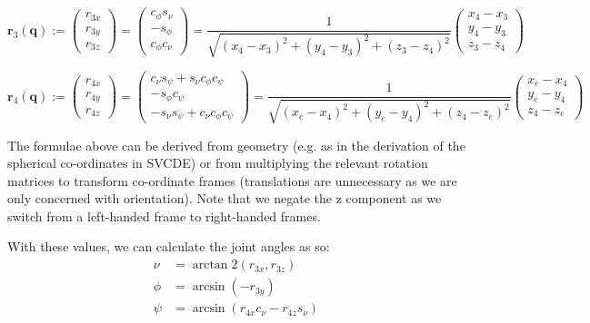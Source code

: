 \documentclass[11pt, a4paper]{article}
\begin{document}
    $$
    \textbf{r}_3(\textbf{q}) :=
    \begin{pmatrix}
        r_{3x}\\
        r_{3y}\\
        r_{3z}
    \end{pmatrix} =
    \begin{pmatrix}
        c_{\phi}s_{\nu}\\
       -s_{\phi}\\
        c_{\phi}c_{\nu}
    \end{pmatrix} = \frac{1}{\sqrt{(x_4 - x_3)^2 + (y_4 - y_3)^2 + (z_3 - z_4)^2}}
    \begin{pmatrix}
        x_4 - x_3\\
        y_4 - y_3\\
        z_3 - z_4
    \end{pmatrix}
    $$

    $$
    \textbf{r}_4(\textbf{q}) :=
    \begin{pmatrix}
        r_{4x}\\
        r_{4y}\\
        r_{4z}
    \end{pmatrix} =
    \begin{pmatrix}
        c_{\nu}s_{\psi} + s_{\nu}c_{\phi}c_{\psi}\\
       -s_{\phi}c_{\psi}\\
       -s_{\nu}s_{\psi} + c_{\nu}c_{\phi}c_{\psi}
    \end{pmatrix} = \frac{1}{\sqrt{(x_e - x_4)^2 + (y_e - y_4)^2 + (z_4 - z_e)^2}}
    \begin{pmatrix}
        x_e - x_4\\
        y_e - y_4\\
        z_4 - z_e
    \end{pmatrix}
    $$

    The formulae above can be derived from geometry (e.g. as in the derivation
    of the spherical co-ordinates in SVCDE) or from multiplying the relevant
    rotation matrices to transform co-ordinate frames (translations are unnecessary
    as we are only concerned with orientation). Note that we negate the z component
    as we switch from a left-handed frame to right-handed frames.

    With these values, we can calculate the joint angles as so:
    \begin{align*}
        \nu  &= \arctan2(r_{3x}, r_{3z})\\
        \phi &= \arcsin(-r_{3y})\\
        \psi &= \arcsin(r_{4x}c_{\nu} - r_{4z}s_{\nu})
    \end{align*}
\end{document}
